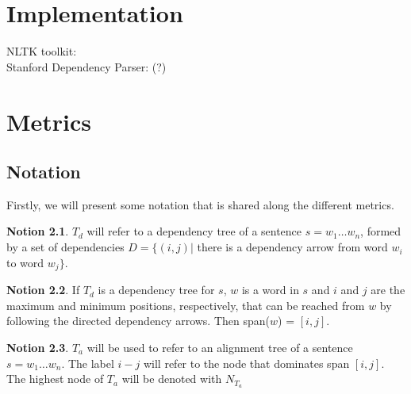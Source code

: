 \documentclass{report}
\theoremstyle{definition}
\newtheorem{notion}{Notion}
\theoremstyle{plain}
\begin{document}
\appendix
\chapter{Implementation}
\label{appendix:impl}

NLTK toolkit: \cite{bird2009natural}\\
Stanford Dependency Parser: \cite{de2008stanford}(?)

%
%



%
%

\chapter{Metrics}
\label{appendix:metric}

\section{Notation}

Firstly, we will present some notation that is shared along the different metrics.

\begin{notion}
$T_d$ will refer to a dependency tree of a sentence $s = w_1 \dots w_n$, formed by a set of dependencies $D = \{ (i,j) |$ there is a dependency arrow from word $w_i$ to word $w_j \}$.
\end{notion}

\begin{notion}
If $T_d$ is a dependency tree for $s$, $w$ is a word in $s$ and $i$ and $j$ are the maximum and minimum positions, respectively, that can be reached from $w$ by following the directed dependency arrows. Then span($w$) = $[i,j]$.
\end{notion}

\begin{notion}
$T_a$ will be used to refer to an alignment tree of a sentence $s = w_1 \dots w_n$. The label $i-j$ will refer to the node that dominates span $[i,j]$. The highest node of $T_a$ will be denoted with $N_{T_a}$
\end{notion}
\end{document}
